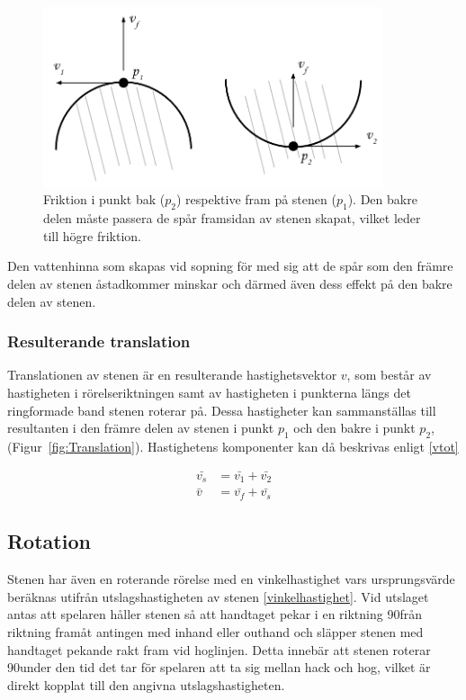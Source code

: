 \documentclass[11pt]{article} %
\begin{document}
\begin{figure}[ht!]
\centering
\includegraphics[width=100mm]{Friktion_bakfram.png}
\caption{Friktion i punkt bak ($p_2$) respektive fram på stenen ($p_1$). Den bakre delen måste passera de spår framsidan av stenen skapat, vilket leder till högre friktion.}
\label{fig:Friktion}
\label{overflow}
\end{figure}

Den vattenhinna som skapas vid sopning för med sig att de spår som den främre delen av stenen åstadkommer minskar och därmed  även dess effekt på den bakre delen av stenen. 

\subsubsection{Resulterande translation}

Translationen av stenen är en resulterande hastighetsvektor $v$, som består av hastigheten i rörelseriktningen samt av hastigheten i punkterna längs det ringformade band stenen roterar på. Dessa hastigheter kan sammanställas till resultanten i den främre delen av stenen i punkt $p_1$ och den bakre i punkt $p_2$, (Figur~\ref{fig:Translation}). Hastighetens komponenter kan då beskrivas enligt \eqref{vtot}

 \begin{subequations}\label{vtot}
 \begin{align}
 \bar{v_s}& = \bar{v_1}+\bar{v_2}\\
 \bar{v}&=\bar{v_f}+\bar{v_s}
 \end{align}
 \end{subequations}

\subsection{Rotation}


Stenen har även en roterande rörelse med en vinkelhastighet vars ursprungsvärde beräknas utifrån utslagshastigheten av stenen \eqref{vinkelhastighet}.
Vid utslaget antas att spelaren håller stenen så att handtaget pekar i en riktning 90\textdegree  från riktning framåt antingen med inhand eller outhand och släpper stenen med handtaget pekande rakt fram vid hoglinjen. Detta innebär att stenen roterar 90\textdegree under den tid det tar för spelaren att ta sig mellan hack och hog, vilket är direkt kopplat till den angivna utslagshastigheten. 
\end{document}
